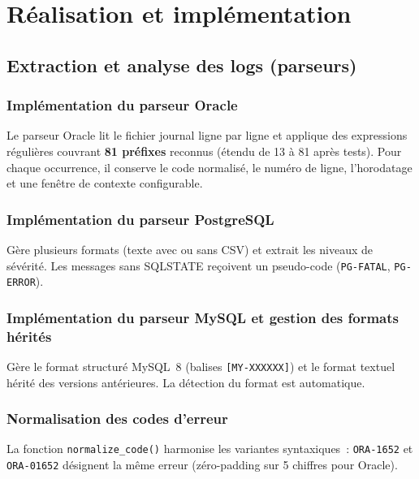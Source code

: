 \documentclass[12pt,a4paper]{report}
\begin{document}
\chapter{R\'ealisation et impl\'ementation}

\section{Extraction et analyse des logs (parseurs)}

\subsection{Impl\'ementation du parseur Oracle}

Le parseur Oracle lit le fichier journal ligne par ligne et applique des expressions
r\'eguli\`eres couvrant \textbf{81 pr\'efixes} reconnus (\'etendu de 13 \`a 81
apr\`es tests). Pour chaque occurrence, il conserve le code normalis\'e, le num\'ero
de ligne, l'horodatage et une fen\^etre de contexte configurable.

\subsection{Impl\'ementation du parseur PostgreSQL}

G\`ere plusieurs formats (texte avec ou sans CSV) et extrait les niveaux de
s\'ev\'erit\'e. Les messages sans SQLSTATE re\c coivent un pseudo-code
(\texttt{PG-FATAL}, \texttt{PG-ERROR}).

\subsection{Impl\'ementation du parseur MySQL et gestion des formats h\'erit\'es}

G\`ere le format structur\'e MySQL~8 (balises \texttt{[MY-XXXXXX]}) et le format
textuel h\'erit\'e des versions ant\'erieures. La d\'etection du format est automatique.

\subsection{Normalisation des codes d'erreur}

La fonction \texttt{normalize\_code()} harmonise les variantes syntaxiques~:
\texttt{ORA-1652} et \texttt{ORA-01652} d\'esignent la m\^eme erreur (z\'ero-padding
sur 5 chiffres pour Oracle).
\end{document}
